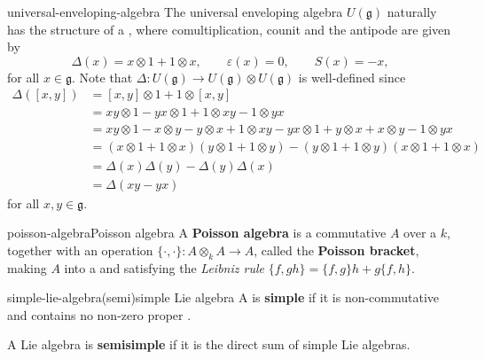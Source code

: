 \begin{example}{universal-enveloping-algebra}
    The universal enveloping algebra $U(\mathfrak{g})$ naturally has the structure of a , where comultiplication, counit and the antipode are given by
    \[ \Delta(x) = x \otimes 1 + 1 \otimes x, \qquad \varepsilon(x) = 0 , \qquad S(x) = -x , \]
    for all $x \in \mathfrak{g}$. Note that $\Delta : U(\mathfrak{g}) \to U(\mathfrak{g}) \otimes U(\mathfrak{g})$ is well-defined since
    \[ \begin{aligned}
        \Delta([x, y])
            &= [x, y] \otimes 1 + 1 \otimes [x, y] \\
            &= xy \otimes 1 - yx \otimes 1 + 1 \otimes xy - 1 \otimes yx \\
            &= xy \otimes 1 - x \otimes y - y \otimes x + 1 \otimes xy - yx \otimes 1 + y \otimes x + x \otimes y - 1 \otimes yx \\
            &= (x \otimes 1 + 1 \otimes x)(y \otimes 1 + 1 \otimes y) - (y \otimes 1 + 1 \otimes y)(x \otimes 1 + 1 \otimes x) \\
            &= \Delta(x) \Delta(y) - \Delta(y) \Delta(x) \\
            &= \Delta(xy - yx)
    \end{aligned} \]
    for all $x, y \in \mathfrak{g}$.
\end{example}

\begin{topic}{poisson-algebra}{Poisson algebra}
    A \textbf{Poisson algebra} is a commutative  $A$ over a  $k$, together with an operation $\{ \cdot, \cdot \} : A \otimes_k A \to A$, called the \textbf{Poisson bracket}, making $A$ into a  and satisfying the \textit{Leibniz rule} $\{ f, gh \} = \{ f, g \} h + g \{ f, h \}$. %
\end{topic}

\begin{topic}{simple-lie-algebra}{(semi)simple Lie algebra}
    A  is \textbf{simple} if it is non-commutative and contains no non-zero proper .
    
    A Lie algebra is \textbf{semisimple} if it is the direct sum of simple Lie algebras.
\end{topic}

